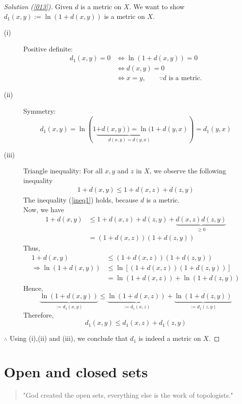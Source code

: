 \documentclass[	DIV=calc,paper=a4,fontsize=11pt]{scrartcl}	 	%
\theoremstyle{definition}
\theoremstyle{plain}
\theoremstyle{remark}
\begin{document}
\begin{proof}[Solution (\ref{013})]
Given $d$ is a metric on $X$. We want to show $d_1(x,y):=\ln(1+d(x,y))$ is a metric on $X$.
\begin{description}
  \item[(i)] Positive definite:
  \begin{align*}
  d_1(x,y)=0 &\Leftrightarrow \ln(1+d(x,y))=0\\
            &\Leftrightarrow d(x,y)=0\\
            &\Leftrightarrow x=y,\qquad \because d\text{ is a metric.}
  \end{align*}
  \item[(ii)] Symmetry:
  \[d_1(x,y)=\ln(1\underbrace{+d(x,y))=\ln(1+}_{d(x,y)=d(y,x)}d(y,x))=d_1(y,x)\]
  \item[(iii)] Triangle inequality: For all $x,y$ and $z$ in $X$, we observe the following inequality
  \begin{align}\label{ineq1}
  1+d(x,y)\leq 1+d(x,z)+d(z,y)
  \end{align}
  The inequality (\ref{ineq1}) holds, because $d$ is a metric.\\
  Now, we have
  \begin{align*}
  1+d(x,y) &\leq 1+d(x,z)+d(z,y)+\underbrace{d(x,z)d(z,y)}_{\geq 0}\\
           &=(1+d(x,z))(1+d(z,y))
  \end{align*}
  Thus,
  \begin{align*}
  1+d(x,y)&\leq (1+d(x,z))(1+d(z,y))\\
  \Rightarrow \ln(1+d(x,y))&\leq \ln[(1+d(x,z))(1+d(z,y))] \tag{Applying ln both side}\\
                           &=\ln(1+d(x,z))+\ln(1+d(z,y))
  \end{align*}
  Hence,
  \[\underbrace{\ln(1+d(x,y))}_{:=d_1(x,y)}\leq \underbrace{\ln(1+d(x,z))}_{:=d_1(x,z)}+\underbrace{\ln(1+d(z,y))}_{:=d_1(z,y)}\]
  Therefore,
  \[d_1(x,y)\leq d_1(x,z)+d_1(z,y)\]
\end{description}
$\therefore$ Using (i),(ii) and (iii), we conclude that $d_1$ is indeed a metric on $X$.
\end{proof}

\newpage
\section{Open and closed sets}
\begin{quote}
"God created the open sets, everything else is the work of topologists."
\end{quote}
\end{document}
